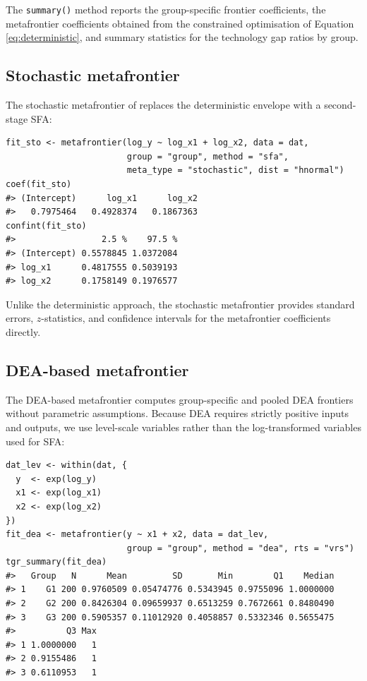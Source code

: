 The \texttt{summary()} method reports the group-specific frontier coefficients, the
metafrontier coefficients obtained from the constrained optimisation of
Equation \eqref{eq:deterministic}, and summary statistics for the technology gap ratios
by group.

\subsection{Stochastic metafrontier}\label{sec:stoch-metafrontier-usage}

The stochastic metafrontier of \citet{huang2014} replaces the deterministic envelope
with a second-stage SFA:

\begin{verbatim}
fit_sto <- metafrontier(log_y ~ log_x1 + log_x2, data = dat,
                        group = "group", method = "sfa",
                        meta_type = "stochastic", dist = "hnormal")
coef(fit_sto)
#> (Intercept)      log_x1      log_x2 
#>   0.7975464   0.4928374   0.1867363
confint(fit_sto)
#>                 2.5 %    97.5 %
#> (Intercept) 0.5578845 1.0372084
#> log_x1      0.4817555 0.5039193
#> log_x2      0.1758149 0.1976577
\end{verbatim}

Unlike the deterministic approach, the stochastic metafrontier provides
standard errors, \(z\)-statistics, and confidence intervals for the metafrontier
coefficients directly.

\subsection{DEA-based metafrontier}\label{sec:dea-metafrontier-usage}

The DEA-based metafrontier computes group-specific and pooled DEA frontiers
without parametric assumptions. Because DEA requires strictly positive inputs
and outputs, we use level-scale variables rather than the log-transformed
variables used for SFA:

\begin{verbatim}
dat_lev <- within(dat, {
  y  <- exp(log_y)
  x1 <- exp(log_x1)
  x2 <- exp(log_x2)
})
fit_dea <- metafrontier(y ~ x1 + x2, data = dat_lev,
                        group = "group", method = "dea", rts = "vrs")
tgr_summary(fit_dea)
#>   Group   N      Mean         SD       Min        Q1    Median
#> 1    G1 200 0.9760509 0.05474776 0.5343945 0.9755096 1.0000000
#> 2    G2 200 0.8426304 0.09659937 0.6513259 0.7672661 0.8480490
#> 3    G3 200 0.5905357 0.11012920 0.4058857 0.5332346 0.5655475
#>          Q3 Max
#> 1 1.0000000   1
#> 2 0.9155486   1
#> 3 0.6110953   1
\end{verbatim}

